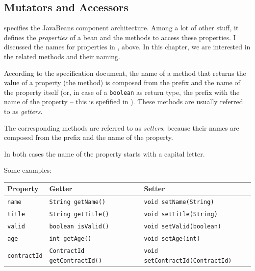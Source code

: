 
\subsection{Mutators and Accessors}\label{sec:MutatorsAccessors}
\autocite{ORACLE_DOC_JAVABEANS} specifies the JavaBeans component architecture. Among a lot of other stuff, it defines the \textit{properties} of a bean and the methods to access these properties. I discussed the names for properties in , above. In this chapter, we are interested in the related methods and their naming.

According to the specification document, the name of a method that returns the value of a property (the  method) is composed from the prefix  and the name of the property itself (or, in case of a \lstinline|boolean| as return type, the prefix  with the name of the property – this is spefified in \autocite{ORACLE_DOC_JAVABEANS:Chapter8_3_2}). These methods are usually referred to as \textit{getters}.

The corresponding  methods are referred to as \textit{setters}, because their names are composed from the prefix  and the name of the property.

In both cases the name of the property starts with a capital letter.

Some examples: \\
\begin{tabular}{|l|l|l|}
\hline 
\textbf{Property} & \textbf{Getter} & \textbf{Setter} \\ 
\hline 
\texttt{name} & \lstinline|String getName()| & \lstinline|void setName(String)| \\ 
\texttt{title} & \lstinline|String getTitle()| & \lstinline|void setTitle(String)| \\ 
\texttt{valid} & \lstinline|boolean isValid()| & \lstinline|void setValid(boolean)| \\ 
\texttt{age} & \lstinline|int getAge()| & \lstinline|void setAge(int)| \\ 
\texttt{contractId} & \lstinline|ContractId getContractId()| & \lstinline|void setContractId(ContractId)| \\ 
\hline 
\end{tabular}

